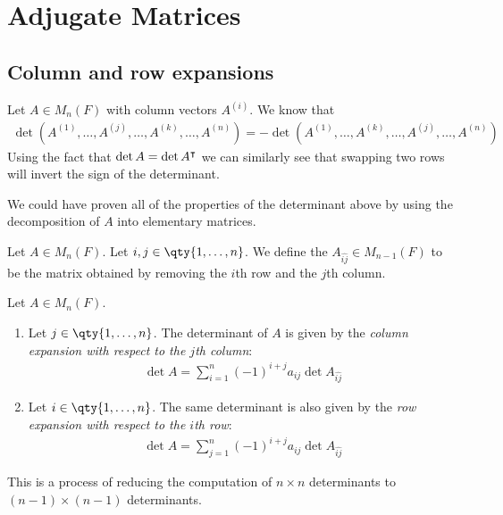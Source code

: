 \section{Adjugate Matrices}

\subsection{Column and row expansions}
Let $A \in M_n(F)$ with column vectors $A^{(i)}$.
We know that
\begin{align*}
	\det(A^{(1)}, \dots, A^{(j)}, \dots, A^{(k)}, \dots, A^{(n)}) = -\det(A^{(1)}, \dots, A^{(k)}, \dots, A^{(j)}, \dots, A^{(n)})
\end{align*}
Using the fact that $\det A = \det A^\intercal$ we can similarly see that swapping two rows will invert the sign of the determinant.
\begin{remark}
	We could have proven all of the properties of the determinant above by using the decomposition of $A$ into elementary matrices.
\end{remark}
\begin{definition}[Minor]
	Let $A \in M_n(F)$.
	Let $i, j \in \qty{1, \dots, n}$.
	We define the  $A_{\widehat{ij}} \in M_{n-1}(F)$ to be the matrix obtained by removing the $i$th row and the $j$th column.
\end{definition}
\begin{lemma}
	Let $A \in M_n(F)$.
	\begin{enumerate}
		\item Let $j \in \qty{1, \dots, n}$.
		      The determinant of $A$ is given by the \textit{column expansion with respect to the $j$th column}:
		      \begin{align*}
			      \det A = \sum_{i=1}^n (-1)^{i+j} a_{ij} \det A_{\widehat{ij}}
		      \end{align*}
		\item Let $i \in \qty{1, \dots, n}$.
		      The same determinant is also given by the \textit{row expansion with respect to the $i$th row}:
		      \begin{align*}
			      \det A = \sum_{j=1}^n (-1)^{i+j} a_{ij} \det A_{\widehat{ij}}
		      \end{align*}
	\end{enumerate}
	This is a process of reducing the computation of $n \times n$ determinants to $(n-1) \times (n-1)$ determinants.
\end{lemma}
